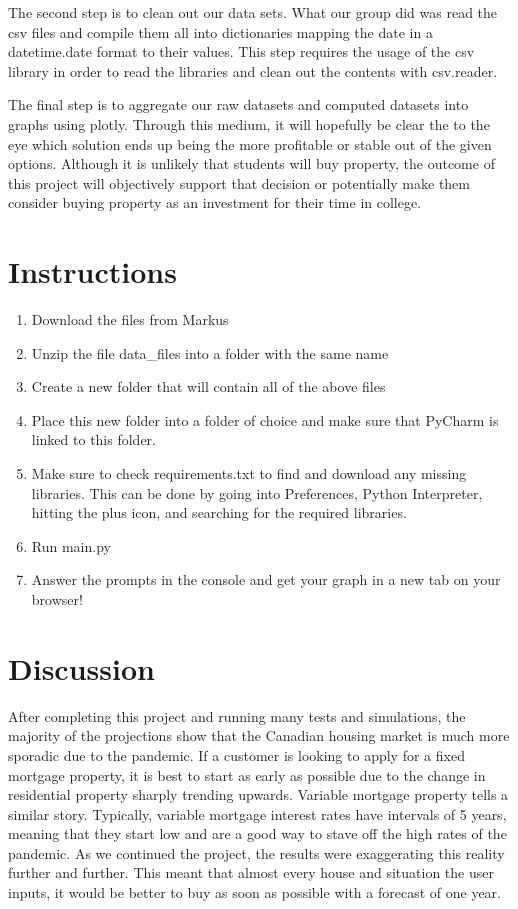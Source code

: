 \documentclass[fontsize=11pt]{article}
\begin{document}
The second step is to clean out our data sets. What our group did was read the csv files and compile them all into dictionaries mapping the date in a datetime.date format to their values. This step requires the usage of the csv library in order to read the libraries and clean out the contents with csv.reader.

The final step is to aggregate our raw datasets and computed datasets into graphs using plotly. Through this medium, it will hopefully be clear the to the eye which solution ends up being the more profitable or stable out of the given options. Although it is unlikely that students will buy property, the outcome of this project will objectively support that decision or potentially make them consider buying property as an investment for their time in college.

\section*{Instructions}
\begin{enumerate}
  \item Download the files from Markus
  \item Unzip the file data\_files into a folder with the same name
  \item Create a new folder that will contain all of the above files
  \item Place this new folder into a folder of choice and make sure that PyCharm is linked to this folder.
  \item Make sure to check requirements.txt to find and download any missing libraries. This can be done by going into Preferences, Python Interpreter, hitting the plus icon, and searching for the required libraries.
  \item Run main.py
  \item Answer the prompts in the console and get your graph in a new tab on your browser!
\end{enumerate}

\section*{Discussion}

After completing this project and running many tests and simulations, the majority of the projections show that the Canadian housing market is much more sporadic due to the pandemic. If a customer is looking to apply for a fixed mortgage property, it is best to start as early as possible due to the change in residential property sharply trending upwards. Variable mortgage property tells a similar story. Typically, variable mortgage interest rates have intervals of 5 years, meaning that they start low and are a good way to stave off the high rates of the pandemic. As we continued the project, the results were exaggerating this reality further and further. This meant that almost every house and situation the user inputs, it would be better to buy as soon as possible with a forecast of one year.
\end{document}
